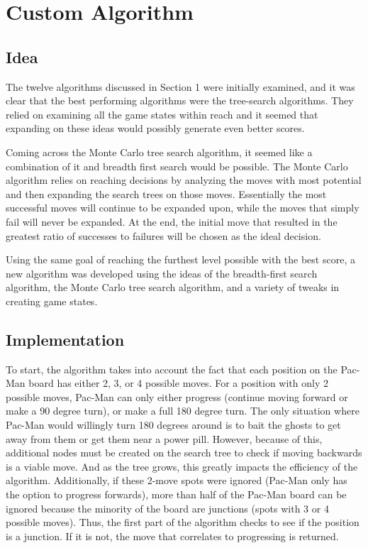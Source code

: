\documentclass[a4paper,oneside,10pt]{report}
\begin{document}
\chapter{Custom Algorithm} \label{custom}

\section {Idea} \label{custIdea}

The twelve algorithms discussed in Section 1 were initially examined, and it was clear that the best performing algorithms were the tree-search algorithms. They relied on examining all the game states within reach and it seemed that expanding on these ideas would possibly generate even better scores. 

Coming across the Monte Carlo tree search algorithm, it seemed like a combination of it and breadth first search would be possible. The Monte Carlo algorithm relies on reaching decisions by analyzing the moves with most potential and then expanding the search trees on those moves. Essentially the most successful moves will continue to be expanded upon, while the moves that simply fail will never be expanded. At the end, the initial move that resulted in the greatest ratio of successes to failures will be chosen as the ideal decision. 

Using the same goal of reaching the furthest level possible with the best score, a new algorithm was developed using the ideas of the breadth-first search algorithm, the Monte Carlo tree search algorithm, and a variety of tweaks in creating game states. 

\section {Implementation} \label{custImp}

To start, the algorithm takes into account the fact that each position on the Pac-Man board has either 2, 3, or 4 possible moves. For a position with only 2 possible moves, Pac-Man can only either progress (continue moving forward or make a 90 degree turn), or make a full 180 degree turn. The only situation where Pac-Man would willingly turn 180 degrees around is to bait the ghosts to get away from them or get them near a power pill. However, because of this, additional nodes must be created on the search tree to check if moving backwards is a viable move. And as the tree grows, this greatly impacts the efficiency of the algorithm. Additionally, if these 2-move spots were ignored (Pac-Man only has the option to progress forwards), more than half of the Pac-Man board can be ignored because the minority of the board are junctions (spots with 3 or 4 possible moves). Thus, the first part of the algorithm checks to see if the position is a junction. If it is not, the move that correlates to progressing is returned.
\end{document}
